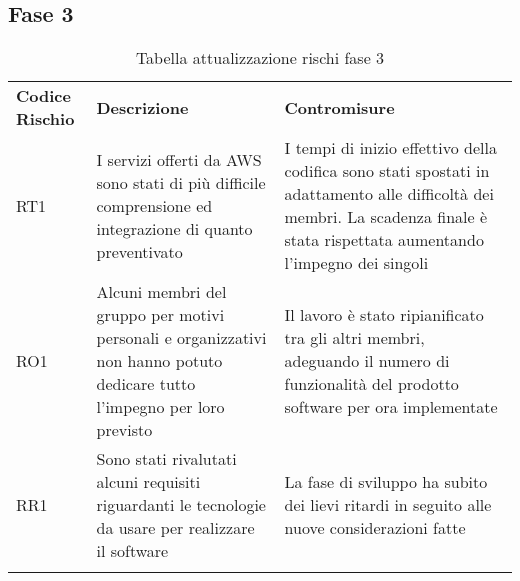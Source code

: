 \subsection{Fase 3}
\label{sec:fase_3}
\begin{center}
\renewcommand{\arraystretch}{1.5}
	\begin{longtable}[H]{  	>{\Centering}p{2cm}	
							>{\RaggedRight}p{6cm}	
							>{\RaggedRight}p{6cm}  
							}
							
		\rowcolor{tableHeadYellow}
		\textbf{Codice Rischio}   & \textbf{Descrizione} & \textbf{Contromisure}\\ 
		RT1	&	I servizi offerti da AWS sono stati di più difficile comprensione ed integrazione di quanto preventivato & I tempi di inizio effettivo della codifica sono stati spostati in adattamento alle difficoltà dei membri. La scadenza finale è stata rispettata aumentando l'impegno dei singoli\\
		RO1	&	Alcuni membri del gruppo per motivi personali e organizzativi non hanno potuto dedicare tutto l'impegno per loro previsto & Il lavoro è stato ripianificato tra gli altri membri, adeguando il numero di funzionalità del prodotto software per ora implementate\\
		RR1	&	Sono stati rivalutati alcuni requisiti riguardanti le tecnologie da usare per realizzare il software & La fase di sviluppo ha subito dei lievi ritardi in seguito alle nuove considerazioni fatte\\
		
		\rowcolor{white}
		\caption{Tabella attualizzazione rischi fase 3}
	\end{longtable}
\end{center}

